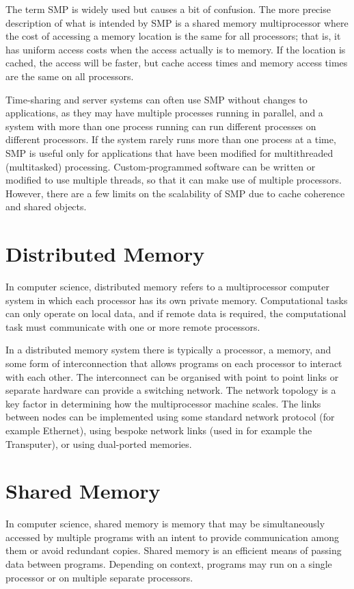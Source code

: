 \documentclass{article}
\begin{document}
The term SMP is widely used but causes a bit of confusion. The more precise description of what is intended by SMP is a shared memory multiprocessor where the cost of accessing a memory location is the same for all processors; that is, it has uniform access costs when the access actually is to memory. If the location is cached, the access will be faster, but cache access times and memory access times are the same on all processors\cite{culler1999parallel}.

Time-sharing and server systems can often use SMP without changes to applications, as they may have multiple processes running in parallel, and a system with more than one process running can run different processes on different processors. If the system rarely runs more than one process at a time, SMP is useful only for applications that have been modified for multithreaded (multitasked) processing. Custom-programmed software can be written or modified to use multiple threads, so that it can make use of multiple processors. However, there are a few limits on the scalability of SMP due to cache coherence and shared objects. 

\section{Distributed Memory}

In computer science, distributed memory refers to a multiprocessor computer system in which each processor has its own private memory. Computational tasks can only operate on local data, and if remote data is required, the computational task must communicate with one or more remote processors.

In a distributed memory system there is typically a processor, a memory, and some form of interconnection that allows programs on each processor to interact with each other. The interconnect can be organised with point to point links or separate hardware can provide a switching network. The network topology is a key factor in determining how the multiprocessor machine scales. The links between nodes can be implemented using some standard network protocol (for example Ethernet), using bespoke network links (used in for example the Transputer), or using dual-ported memories. 

\section{Shared Memory}

In computer science, shared memory is memory that may be simultaneously accessed by multiple programs with an intent to provide communication among them or avoid redundant copies. Shared memory is an efficient means of passing data between programs. Depending on context, programs may run on a single processor or on multiple separate processors. 
\end{document}
